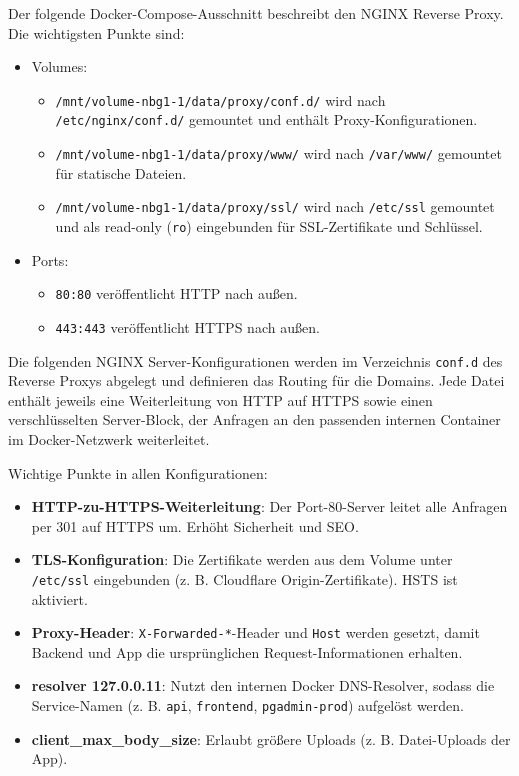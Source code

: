 \documentclass[11pt]{article}
\begin{document}
    Der folgende Docker-Compose-Ausschnitt beschreibt den NGINX Reverse Proxy. Die wichtigsten Punkte sind:
    \begin{itemize}
        \item Volumes:
        \begin{itemize}
            \item \texttt{/mnt/volume-nbg1-1/data/proxy/conf.d/} wird nach \texttt{/etc/nginx/conf.d/} gemountet und enthält Proxy-Konfigurationen.
            \item \texttt{/mnt/volume-nbg1-1/data/proxy/www/} wird nach \texttt{/var/www/} gemountet für statische Dateien.
            \item \texttt{/mnt/volume-nbg1-1/data/proxy/ssl/} wird nach \texttt{/etc/ssl} gemountet und als read-only (\texttt{ro}) eingebunden für SSL-Zertifikate und Schlüssel.
        \end{itemize}
        \item Ports:
        \begin{itemize}
            \item \texttt{80:80} veröffentlicht HTTP nach außen.
            \item \texttt{443:443} veröffentlicht HTTPS nach außen.
        \end{itemize}
    \end{itemize}

    

    Die folgenden NGINX Server-Konfigurationen werden im Verzeichnis \texttt{conf.d} des Reverse Proxys abgelegt und definieren das Routing für die Domains.
    Jede Datei enthält jeweils eine Weiterleitung von HTTP auf HTTPS sowie einen verschlüsselten Server-Block, der Anfragen an den passenden
    internen Container im Docker-Netzwerk weiterleitet.

    Wichtige Punkte in allen Konfigurationen:
    \begin{itemize}
        \item \textbf{HTTP-zu-HTTPS-Weiterleitung}: Der Port-80-Server leitet alle Anfragen per 301 auf HTTPS um. Erhöht Sicherheit und SEO.
        \item \textbf{TLS-Konfiguration}: Die Zertifikate werden aus dem Volume unter \texttt{/etc/ssl} eingebunden (z. B. Cloudflare Origin-Zertifikate). HSTS ist aktiviert.
        \item \textbf{Proxy-Header}: \texttt{X-Forwarded-*}-Header und \texttt{Host} werden gesetzt, damit Backend und App die ursprünglichen Request-Informationen erhalten.
        \item \textbf{resolver 127.0.0.11}: Nutzt den internen Docker DNS-Resolver, sodass die Service-Namen (z. B. \texttt{api}, \texttt{frontend}, \texttt{pgadmin-prod}) aufgelöst werden.
        \item \textbf{client\_max\_body\_size}: Erlaubt größere Uploads (z. B. Datei-Uploads der App).
    \end{itemize}
\end{document}
